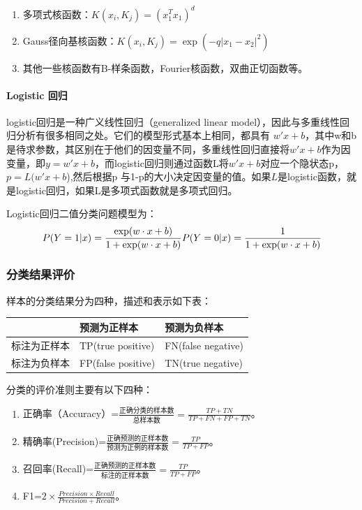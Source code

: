 \documentclass{article}
\begin{document}
\begin{enumerate}
\def\labelenumi{\arabic{enumi}.}
\tightlist
\item
  多项式核函数：\(K(x_{i},K_{j})=(x_{1}^{T}x_{1})^{d}\)
\item
  Gauss径向基核函数：\(K(x_{i},K_{j})=\exp(-q\lvert x_{1}-x_{2}\rvert^{2})\)
\item
  其他一些核函数有B-样条函数，Fourier核函数，双曲正切函数等。
\end{enumerate}

\paragraph{Logistic 回归}\label{logistic-ux56deux5f52}

logistic回归是一种广义线性回归（generalized linear
model），因此与多重线性回归分析有很多相同之处。它们的模型形式基本上相同，都具有
\(w'x+b\)，其中w和b是待求参数，其区别在于他们的因变量不同，多重线性回归直接将\(w'x+b\)作为因变量，即\(y =w'x+b\)，而logistic回归则通过函数L将\(w'x+b\)对应一个隐状态p，\(p =L(w'x+b\)),然后根据p
与1-p的大小决定因变量的值。如果\(L\)是logistic函数，就是logistic回归，如果L是多项式函数就是多项式回归。

Logistic回归二值分类问题模型为： \[
P(Y=1|x)=\frac {\exp(w \cdot x + b)} {1 + \exp(w \cdot x + b)} \\ 
P(Y=0|x)=\frac {1} {1 + \exp(w \cdot x + b)}
\]

\subsubsection{分类结果评价}\label{ux5206ux7c7bux7ed3ux679cux8bc4ux4ef7}

样本的分类结果分为四种，描述和表示如下表：

\begin{longtable}[]{@{}lll@{}}
\toprule
& 预测为正样本 & 预测为负样本\tabularnewline
\midrule
\endhead
标注为正样本 & TP(true positive) & FN(false negative)\tabularnewline
标注为负样本 & FP(false positive) & TN(true negative)\tabularnewline
\bottomrule
\end{longtable}

分类的评价准则主要有以下四种：

\begin{enumerate}
\def\labelenumi{\arabic{enumi}.}
\tightlist
\item
  正确率（Accuracy）=\(\frac{正确分类的样本数}{总样本数}=\frac{TP+TN}{TP+FN+FP+TN}\)。
\item
  精确率(Precision)=\(\frac{正确预测的正样本数}{预测为正例的样本数}=\frac{TP}{TP+FP}\)。
\item
  召回率(Recall)=\(\frac{正确预测的正样本数}{标注的正样本数}=\frac{TP}{TP+FP}\)。
\item
  F1=\(2\times \frac{Precision\times Recall}{Precision+Recall}\)。
\end{enumerate}
\end{document}

